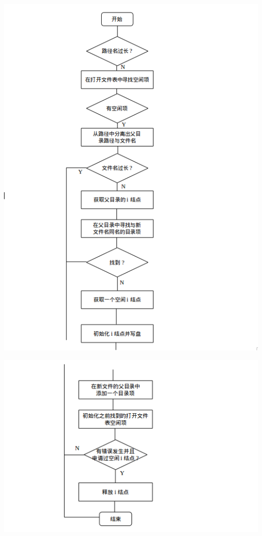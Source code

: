\documentclass[nofonts]{ctexart}
\begin{document}
\begin{itemize}
  \includegraphics[width=15cm]{./images/./creat_1.png}

  \includegraphics[width=15cm]{./images/./creat_2.png}
  \end{itemize}
\end{document}
